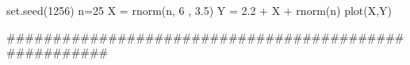 
set.seed(1256)
n=25
X = rnorm(n, 6 , 3.5)
Y = 2.2 + X + rnorm(n)
plot(X,Y)

######################################################
